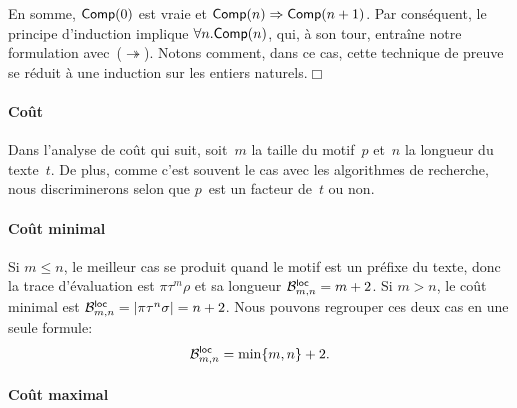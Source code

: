 En somme, \(\pred{Comp}{0}\) est vraie et \(\pred{Comp}{n} \Rightarrow
\pred{Comp}{n+1}\). Par conséquent, le principe d'induction implique
\(\forall n.\pred{Comp}{n}\), qui, à son tour, entraîne notre
formulation avec~(\(\twoheadrightarrow\)). Notons comment, dans ce
cas, cette technique de preuve se réduit à une induction sur les
entiers naturels.\hfill\(\Box\) 

\paragraph{Coût}

Dans l'analyse de coût qui suit, soit~\(m\) la taille du motif~\(p\)
et~\(n\) la longueur du texte~\(t\). De plus, comme c'est souvent le
cas avec les algorithmes de recherche, nous discriminerons selon que
\(p\)~est un facteur de~\(t\) ou non.

\paragraph{Coût minimal}

Si \(m \leqslant n\), le meilleur cas se produit quand le motif est un
préfixe du texte, donc la trace d'évaluation est \(\pi\tau^m\rho\) et
sa longueur \(\B{\fun{loc}}{m,n} = m + 2\). Si \(m > n \), le coût
minimal est \(\B{\fun{loc}}{m,n} = \len{\pi\tau^n\sigma} = n +
2\). Nous pouvons regrouper ces deux cas en une seule formule:
\begin{equation*}
\B{\fun{loc}}{m,n} = \min\{m,n\} + 2.\index{loc@$\B{\fun{loc}}{m,n}$}
\end{equation*}

\paragraph{Coût maximal}

